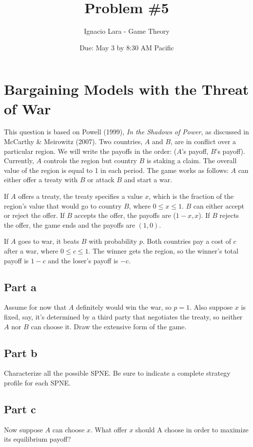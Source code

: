 \documentclass[10pt]{article}
\title{Problem \#5}
\author{Ignacio Lara - Game Theory}
\date{Due: May 3 by 8:30 AM Pacific}
\begin{document}
\maketitle

\section*{Bargaining Models with the Threat of War}

This question is based on Powell (1999), \emph{In the Shadows of Power}, as discussed in McCarthy \& Meirowitz (2007). Two countries, $A$ and $B$, are in conflict over a particular region. We will write the payoffs in the order: ($A$'s payoff, $B$'s payoff). Currently, $A$ controls the region but country $B$ is staking a claim. The overall value of the region is equal to 1 in each period. The game works as follows: $A$ can either offer a treaty with $B$ or attack $B$ and start a war.

If $A$ offers a treaty, the treaty specifies a value $x$, which is the fraction of the region's value that would go to country $B$, where $0\leq x\leq1$. $B$ can either accept or reject the offer. If $B$ accepts the offer, the payoffs are ($1-x,x$). If $B$ rejects the offer, the game ends and the payoffs are $(1,0)$.

If $A$ goes to war, it beats $B$ with probability $p$. Both countries pay a cost of $c$ after a war, where $0\leq c\leq1$. The winner gets the region, so the winner's total payoff is $1-c$ and the loser's payoff is $-c$.

\newpage

\subsection*{Part a} Assume for now that $A$ definitely would win the war, so $p=1$. Also suppose $x$ is fixed, say, it's determined by a third party that negotiates the treaty, so neither $A$ nor $B$ can choose it. Draw the extensive form of the game.

\newpage

\subsection*{Part b} Characterize all the possible SPNE. Be sure to indicate a complete strategy profile for each SPNE.

\newpage

\subsection*{Part c} Now suppose $A$ can choose $x$. What offer $x$ should A choose in order to maximize its equilibrium payoff?
\end{document}
